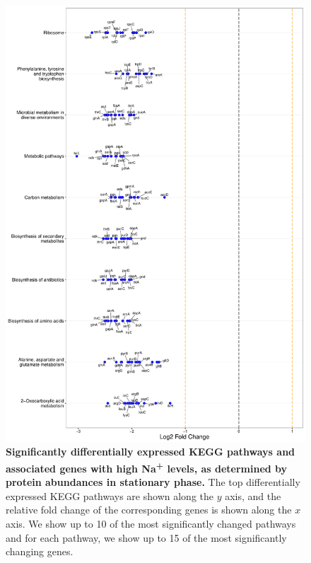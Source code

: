 \documentclass[a4paper]{article}
\begin{document}
\clearpage
\begin{figure}
	\includegraphics[width=1.0\textwidth]{../../d_figures/kegg_16.pdf}
	\caption[Significantly differentially expressed KEGG pathways for protein samples in stationary phase tested for high Na\textsuperscript{+} against base Na\textsuperscript{+}]
	{\textbf{Significantly differentially expressed KEGG pathways and associated genes with high Na\textsuperscript{+} levels, as determined by protein abundances in stationary phase.} The top differentially expressed KEGG pathways are shown along the $y$ axis, and the relative fold change of the corresponding genes is shown along the $x$ axis. We show up to 10 of the most significantly changed pathways and for each pathway, we show up to 15 of the most significantly changing genes.}
\end{figure}
\clearpage
\end{document}

